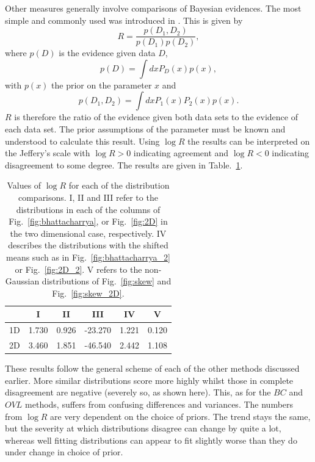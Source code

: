 \documentclass[twocolumn]{revtex4-1}
\begin{document}
    Other measures generally involve comparisons of Bayesian evidences.
    The most simple and commonly used was introduced in \cite{Marshall:2004zd}.
    This is given by
    \begin{equation}
        R = \frac{p(D_1, D_2)}{p(D_1)p(D_2)},
    \end{equation}
    where $p(D)$ is the evidence given data $D$,
    \begin{equation}
        p(D) = \int dx P_D(x)p(x),
    \end{equation}
    with $p(x)$ the prior on the parameter $x$ and 
    \begin{equation}
        p(D_1, D_2) = \int dx P_{1}(x)P_2(x)p(x).
    \end{equation}
    $R$ is therefore the ratio of the evidence given both data sets to the evidence of each data set.
    The prior assumptions of the parameter must be known and understood to calculate this result.
    Using $\log R$ the results can be interpreted on the Jeffery's scale with $\log R>0$ indicating agreement and $\log R<0$ indicating disagreement to some degree.
    The results are given in Table.~\ref{tab:R}.
    \begin{table}
        \centering
        \begin{tabular}{l|ccccc}
              & I & II & III & IV & V \\ \hline\hline
           1D & 1.730 & 0.926 & -23.270 & 1.221 & 0.120 \\
           2D & 3.460 & 1.851 & -46.540 & 2.442 & 1.108
        \end{tabular}
        \caption{Values of $\log R$ for each of the distribution comparisons. I, II and III refer to the distributions in each of the columns of Fig.~\ref{fig:bhattacharrya}, or Fig.~\ref{fig:2D} in the two dimensional case, respectively. IV describes the distributions with the shifted means such as in Fig.~\ref{fig:bhattacharrya_2} or Fig.~\ref{fig:2D_2}. V refers to the non-Gaussian distributions of Fig.~\ref{fig:skew} and Fig.~\ref{fig:skew_2D}.}
        \label{tab:R}
    \end{table}
    \noindent These results follow the general scheme of each of the other methods discussed earlier.
    More similar distributions score more highly whilst those in complete disagreement are negative (severely so, as shown here).
    This, as for the $BC$ and $OVL$ methods, suffers from confusing differences and variances.
    The numbers from $\log R$ are very dependent on the choice of priors.
    The trend stays the same, but the severity at which distributions disagree can change by quite a lot, whereas well fitting distributions can appear to fit slightly worse than they do under change in choice of prior.
\end{document}
